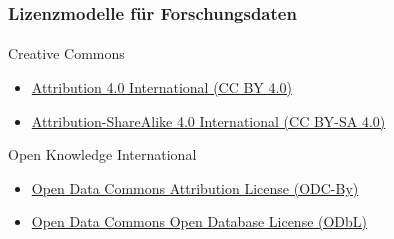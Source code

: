 \begin{frame}
    \frametitle{Lizenzmodelle für Forschungsdaten}
    \framesubtitle{ }


    \begin{block}{Creative Commons}
        \begin{itemize}
            \item [\ExternalLink] \href{https://creativecommons.org/licenses/by/4.0/}{Attribution 4.0 International (CC BY 4.0)}


            \item [\ExternalLink] \href{https://creativecommons.org/licenses/by-sa/4.0/}{Attribution-ShareAlike 4.0 International (CC BY-SA 4.0)}


        \end{itemize}
    \end{block}

    \begin{block}{Open Knowledge International}
        \begin{itemize}
            \item [\ExternalLink] \href{https://opendatacommons.org/licensesby/}{Open Data Commons Attribution License (ODC-By)}


            \item [\ExternalLink] \href{https://opendatacommons.org/licenses/odbl/}{Open Data Commons Open Database License (ODbL)}

        \end{itemize}
    \end{block}

\end{frame}

